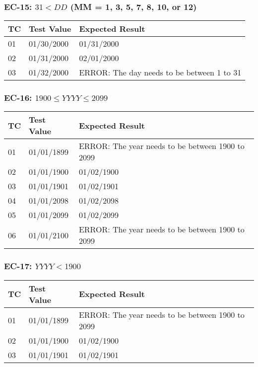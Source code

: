 \documentclass[11pt, oneside]{article}   	%
\begin{document}
\subsubsection{EC-15: $31 < DD$ (MM = 1, 3, 5, 7, 8, 10, or 12)}
\begin{table}[H]
\begin{tabular}{|l|l|l|}
\hline
TC & Test Value & Expected Result                            \\ \hline
01 & 01/30/2000 & 01/31/2000                                 \\ \hline
02 & 01/31/2000 & 02/01/2000                                 \\ \hline
03 & 01/32/2000 & ERROR: The day needs to be between 1 to 31 \\ \hline
\end{tabular}
\end{table}

\subsubsection{EC-16: $1900 \leq YYYY \leq 2099$}
\begin{table}[H]
\begin{tabular}{|l|l|l|}
\hline
TC & Test Value & Expected Result                                  \\ \hline
01 & 01/01/1899 & ERROR: The year needs to be between 1900 to 2099 \\ \hline
02 & 01/01/1900 & 01/02/1900                                       \\ \hline
03 & 01/01/1901 & 01/02/1901                                       \\ \hline
04 & 01/01/2098 & 01/02/2098                                       \\ \hline
05 & 01/01/2099 & 01/02/2099                                       \\ \hline
06 & 01/01/2100 & ERROR: The year needs to be between 1900 to 2099 \\ \hline
\end{tabular}
\end{table}

\subsubsection{EC-17: $YYYY < 1900$}
\begin{table}[H]
\begin{tabular}{|l|l|l|}
\hline
TC & Test Value & Expected Result                                  \\ \hline
01 & 01/01/1899 & ERROR: The year needs to be between 1900 to 2099 \\ \hline
02 & 01/01/1900 & 01/02/1900                                       \\ \hline
03 & 01/01/1901 & 01/02/1901                                       \\ \hline
\end{tabular}
\end{table}
\end{document}
